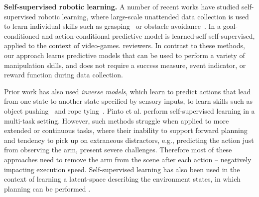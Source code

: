 \noindent \textbf{Self-supervised robotic learning.}
A number of recent works have studied self-supervised robotic learning, where large-scale unattended data collection is used to learn individual skills such as grasping~\cite{mottaghi2016happens, lerrel,google_handeye, calandra2017feeling} or obstacle avoidance~\cite{greg_kahn_uncertainty,crashing}. 
In \cite{alexey} a goal-conditioned and action-conditional predictive model is learned-self self-supervised, applied to the context of video-games.
 reviewers. 
In contrast to these methods, our approach learns predictive models that can be used to perform a variety of manipulation skills, and does not require a success measure, event indicator, or reward function during data collection. 

Prior work has also used \emph{inverse models}, which learn to predict actions that lead from one state to another state specified by sensory inputs, to learn skills such as object pushing~\cite{agrawal2016learning} and rope tying~\cite{nair2017combining, ropes}.
Pinto et al. \cite{pinto2016curious} perform self-supervised learning in a multi-task setting. However, such methods struggle when applied to more extended or continuous tasks, where their inability to support forward planning and tendency to pick up on extraneous distractors, e.g., predicting the action just from observing the arm, present severe challenges. Therefore most of these approaches need to remove the arm from the scene after each action -- negatively impacting execution speed.
Self-supervised learning has also been used in the context of learning a latent-space describing the environment states, in which planning can be performed \cite{kurutach2018learning}.

